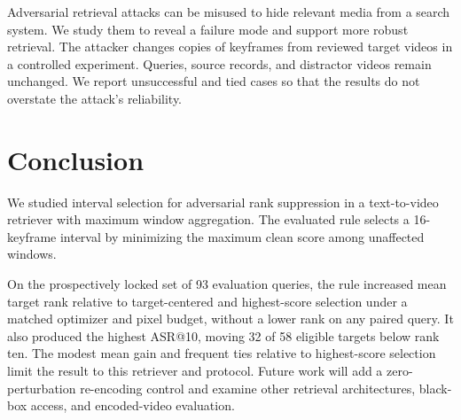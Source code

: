\documentclass[runningheads]{llncs}
\begin{document}
Adversarial retrieval attacks can be misused to hide relevant media from a search system. We study them to reveal a failure mode and support more robust retrieval. The attacker changes copies of keyframes from reviewed target videos in a controlled experiment. Queries, source records, and distractor videos remain unchanged. We report unsuccessful and tied cases so that the results do not overstate the attack's reliability.

\section{Conclusion}

We studied interval selection for adversarial rank suppression in a text-to-video retriever with maximum window aggregation. The evaluated rule selects a 16-keyframe interval by minimizing the maximum clean score among unaffected windows.

On the prospectively locked set of 93 evaluation queries, the rule increased mean target rank relative to target-centered and highest-score selection under a matched optimizer and pixel budget, without a lower rank on any paired query. It also produced the highest ASR@10, moving 32 of 58 eligible targets below rank ten. The modest mean gain and frequent ties relative to highest-score selection limit the result to this retriever and protocol. Future work will add a zero-perturbation re-encoding control and examine other retrieval architectures, black-box access, and encoded-video evaluation.

%
%
%


%
\end{document}
